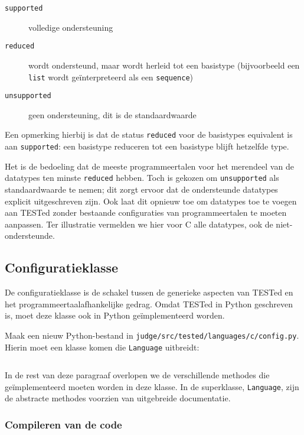 \begin{description}
    \item[\texttt{supported}] volledige ondersteuning
    \item[\texttt{reduced}] wordt ondersteund, maar wordt herleid tot een basistype (bijvoorbeeld een \texttt{list} wordt geïnterpreteerd als een \texttt{sequence})
    \item[\texttt{unsupported}] geen ondersteuning, dit is de standaardwaarde
\end{description}

Een opmerking hierbij is dat de status \texttt{reduced} voor de basistypes equivalent is aan \texttt{supported}: een basistype reduceren tot een basistype blijft hetzelfde type.

Het is de bedoeling dat de meeste programmeertalen voor het merendeel van de datatypes ten minste \texttt{reduced} hebben.
Toch is gekozen om \texttt{unsupported} als standaardwaarde te nemen;
dit zorgt ervoor dat de ondersteunde datatypes explicit uitgeschreven zijn.
Ook laat dit opnieuw toe om datatypes toe te voegen aan TESTed zonder bestaande configuraties van programmeertalen te moeten aanpassen.
Ter illustratie vermelden we hier voor C alle datatypes, ook de niet-ondersteunde.

\subsection{Configuratieklasse}\label{subsec:configuratieklasse}

De configuratieklasse is de schakel tussen de generieke aspecten van TESTed en het programmeertaalafhankelijke gedrag.
Omdat TESTed in Python geschreven is, moet deze klasse ook in Python geïmplementeerd worden.

Maak een nieuw Python-bestand in \texttt{judge/src/tested/languages/c/config.py}.
Hierin moet een klasse komen die \texttt{Language} uitbreidt:

\inputminted[firstline=9,lastline=9]{python}{sources/c-config.py}

In de rest van deze paragraaf overlopen we de verschillende methodes die geïmplementeerd moeten worden in deze klasse.
In de superklasse, \texttt{Language}, zijn de abstracte methodes voorzien van uitgebreide documentatie.

\subsubsection{Compileren van de code}

